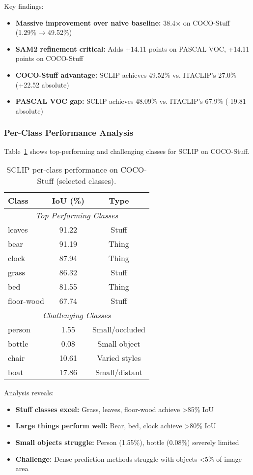 Key findings:
\begin{itemize}
    \item \textbf{Massive improvement over naive baseline:} 38.4$\times$ on COCO-Stuff (1.29\% → 49.52\%)
    \item \textbf{SAM2 refinement critical:} Adds +14.11 points on PASCAL VOC, +14.11 points on COCO-Stuff
    \item \textbf{COCO-Stuff advantage:} SCLIP achieves 49.52\% vs. ITACLIP's 27.0\% (+22.52 absolute)
    \item \textbf{PASCAL VOC gap:} SCLIP achieves 48.09\% vs. ITACLIP's 67.9\% (-19.81 absolute)
\end{itemize}

\subsubsection{Per-Class Performance Analysis}

Table~\ref{tab:sclip_per_class} shows top-performing and challenging classes for SCLIP on COCO-Stuff.

\begin{table}[h]
\centering
\caption{SCLIP per-class performance on COCO-Stuff (selected classes).}
\label{tab:sclip_per_class}
\begin{tabular}{lcc}
\hline
\textbf{Class} & \textbf{IoU (\%)} & \textbf{Type} \\
\hline
\multicolumn{3}{c}{\textit{Top Performing Classes}} \\
\hline
leaves & 91.22 & Stuff \\
bear & 91.19 & Thing \\
clock & 87.94 & Thing \\
grass & 86.32 & Stuff \\
bed & 81.55 & Thing \\
floor-wood & 67.74 & Stuff \\
\hline
\multicolumn{3}{c}{\textit{Challenging Classes}} \\
\hline
person & 1.55 & Small/occluded \\
bottle & 0.08 & Small object \\
chair & 10.61 & Varied styles \\
boat & 17.86 & Small/distant \\
\hline
\end{tabular}
\end{table}

Analysis reveals:
\begin{itemize}
    \item \textbf{Stuff classes excel:} Grass, leaves, floor-wood achieve >85\% IoU
    \item \textbf{Large things perform well:} Bear, bed, clock achieve >80\% IoU
    \item \textbf{Small objects struggle:} Person (1.55\%), bottle (0.08\%) severely limited
    \item \textbf{Challenge:} Dense prediction methods struggle with objects <5\% of image area
\end{itemize}

